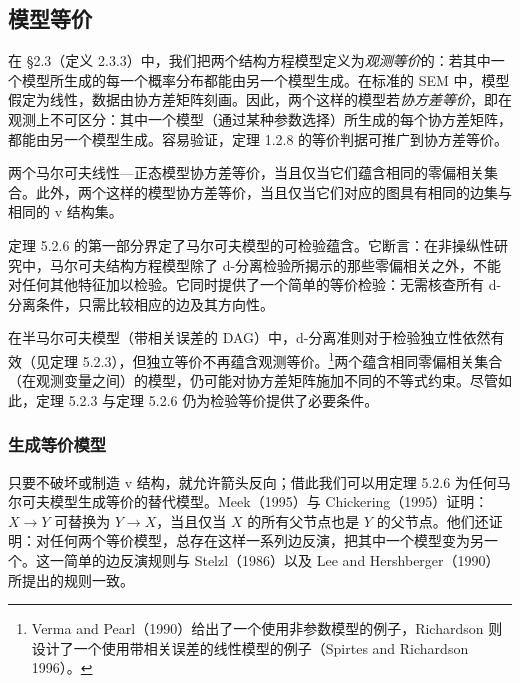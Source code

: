 \subsection{模型等价}

在 \S 2.3（定义 2.3.3）中，我们把两个结构方程模型定义为\emph{观测等价}的：若其中一个模型所生成的每一个概率分布都能由另一个模型生成。在标准的 SEM 中，模型假定为线性，数据由协方差矩阵刻画。因此，两个这样的模型若\emph{协方差等价}，即在观测上不可区分：其中一个模型（通过某种参数选择）所生成的每个协方差矩阵，都能由另一个模型生成。容易验证，定理 1.2.8 的等价判据可推广到协方差等价。

\begin{theorem}
两个马尔可夫线性—正态模型协方差等价，当且仅当它们蕴含相同的零偏相关集合。此外，两个这样的模型协方差等价，当且仅当它们对应的图具有相同的边集与相同的 v 结构集。
\end{theorem}

定理 5.2.6 的第一部分界定了马尔可夫模型的可检验蕴含。它断言：在非操纵性研究中，马尔可夫结构方程模型除了 d-分离检验所揭示的那些零偏相关之外，不能对任何其他特征加以检验。它同时提供了一个简单的等价检验：无需核查所有 d-分离条件，只需比较相应的边及其方向性。

在半马尔可夫模型（带相关误差的 DAG）中，d-分离准则对于检验独立性依然有效（见定理 5.2.3），但独立等价不再蕴含观测等价。\footnote{Verma and Pearl（1990）给出了一个使用非参数模型的例子，Richardson 则设计了一个使用带相关误差的线性模型的例子（Spirtes and Richardson 1996）。}两个蕴含相同零偏相关集合（在观测变量之间）的模型，仍可能对协方差矩阵施加不同的不等式约束。尽管如此，定理 5.2.3 与定理 5.2.6 仍为检验等价提供了必要条件。

\subsubsection*{生成等价模型}

只要不破坏或制造 v 结构，就允许箭头反向；借此我们可以用定理 5.2.6 为任何马尔可夫模型生成等价的替代模型。Meek（1995）与 Chickering（1995）证明：$X\to Y$ 可替换为 $Y\to X$，当且仅当 $X$ 的所有父节点也是 $Y$ 的父节点。他们还证明：对任何两个等价模型，总存在这样一系列边反演，把其中一个模型变为另一个。这一简单的边反演规则与 Stelzl（1986）以及 Lee and Hershberger（1990）所提出的规则一致。

